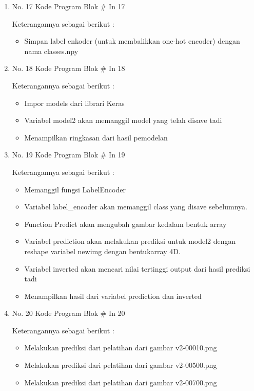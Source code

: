 \begin{enumerate}
\item No. 17 Kode Program Blok \# In 17
\par 
Keterangannya sebagai berikut :
\begin{itemize}
\item Simpan label enkoder (untuk membalikkan one-hot encoder) dengan nama classes.npy
\end{itemize}

\item No. 18 Kode Program Blok \# In 18
\par 
Keterangannya sebagai berikut :
\begin{itemize}
\item Impor models dari librari Keras
\item Variabel model2 akan memanggil model yang telah disave tadi 
\item Menampilkan ringkasan dari hasil pemodelan
\end{itemize}

\item No. 19 Kode Program Blok \# In 19
\par 
Keterangannya sebagai berikut :
\begin{itemize}
\item Memanggil fungsi LabelEncoder
\item Variabel label\_encoder akan memanggil class yang disave sebelumnya.
\item Function Predict akan mengubah gambar kedalam bentuk array
\item Variabel prediction akan melakukan prediksi untuk model2 dengan reshape variabel newimg dengan bentukarray 4D.
\item Variabel inverted akan mencari nilai tertinggi output dari hasil prediksi tadi
\item Menampilkan hasil dari variabel prediction dan inverted
\end{itemize}

\item No. 20 Kode Program Blok \# In 20
\par 
Keterangannya sebagai berikut :
\begin{itemize}
\item Melakukan prediksi dari pelatihan dari gambar v2-00010.png
\item Melakukan prediksi dari pelatihan dari gambar v2-00500.png
\item Melakukan prediksi dari pelatihan dari gambar v2-00700.png
\end{itemize}

\end{enumerate}